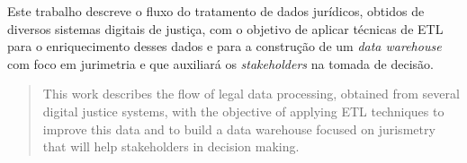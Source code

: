 \begin{resumo} 
  Este trabalho descreve o fluxo do tratamento de dados jurídicos, obtidos de diversos sistemas digitais de justiça, com o objetivo de aplicar técnicas de ETL para o enriquecimento desses dados e para a construção de um \textit{data warehouse} com foco em jurimetria e que auxiliará os \textit{stakeholders} na tomada de decisão.
\end{resumo}

\begin{abstract}
  This work describes the flow of legal data processing, obtained from several digital justice systems, with the objective of applying ETL techniques to improve this data and to build a data warehouse focused on jurismetry that will help stakeholders in decision making.
\end{abstract}